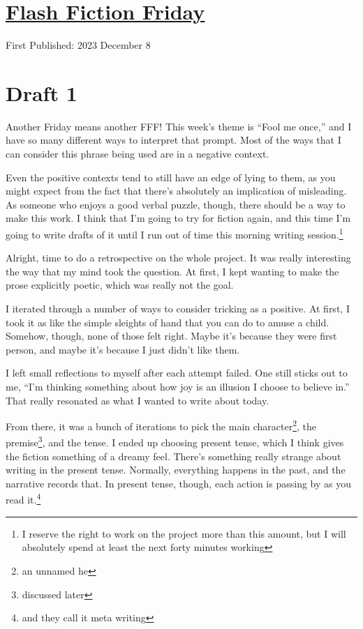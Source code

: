 \documentclass[12pt]{article}[titlepage]
\newcommand{\say}[1]{``#1''}
\newcommand{\1}{\={a}}
\newcommand{\2}{\={e}}
\newcommand{\3}{\={\i}}
\newcommand{\4}{\=o}
\newcommand{\5}{\=u}
\newcommand{\6}{\={A}}
\renewcommand{\,}{\textsuperscript{,}}
\begin{document}
\doublespacing
\section{\href{flash-fiction-30.html}{Flash Fiction Friday}}
First Published: 2023 December 8

\section{Draft 1}
Another Friday means another FFF!
This week's theme is \say{Fool me once,} and I have so many different ways to interpret that prompt.
Most of the ways that I can consider this phrase being used are in a negative context.

Even the positive contexts tend to still have an edge of lying to them, as you might expect from the fact that there's absolutely an implication of misleading.
As someone who enjoys a good verbal puzzle, though, there should be a way to make this work.
I think that I'm going to try for fiction again, and this time I'm going to write drafts of it until I run out of time this morning writing session.\footnote{I reserve the right to work on the project more than this amount, but I will absolutely spend at least the next forty minutes working}

Alright, time to do a retrospective on the whole project.
It was really interesting the way that my mind took the question.
At first, I kept wanting to make the prose explicitly poetic, which was really not the goal.

I iterated through a number of ways to consider tricking as a positive.
At first, I took it as like the simple sleights of hand that you can do to amuse a child.
Somehow, though, none of those felt right.
Maybe it's because they were first person, and maybe it's because I just didn't like them.

I left small reflections to myself after each attempt failed.
One still sticks out to me, \say{I'm thinking something about how joy is an illusion I choose to believe in.}
That really resonated as what I wanted to write about today.

From there, it was a bunch of iterations to pick the main character\footnote{an unnamed he}, the premise\footnote{discussed later}, and the tense.
I ended up choosing present tense, which I think gives the fiction something of a dreamy feel.
There's something really strange about writing in the present tense.
Normally, everything happens in the past, and the narrative records that.
In present tense, though, each action is passing by as you read it.\footnote{and they call it meta writing}
\end{document}
